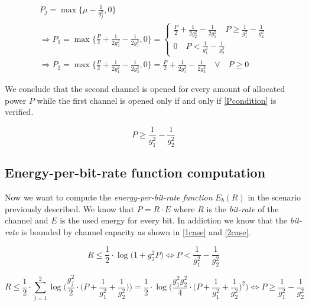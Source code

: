 \begin{equation}
	\begin{gathered}
	 P_j = \max\Big\{\mu - \frac{1}{g_j^2},0\Big\} \\
	 \Rightarrow P_1= \max\Big\{\frac{P}{2} + \frac{1}{2g_2^2} - \frac{1}{2g_1^2},0\Big\} = \begin{cases}
	  \frac{P}{2} + \frac{1}{2g_2^2} - \frac{1}{2g_1^2} \quad P \geq \frac{1}{g_1^2} - \frac{1}{g_2^2} \\
		0 \quad P < \frac{1}{g_1^2} - \frac{1}{g_2^2}
	 \end{cases} \\
	 \Rightarrow P_2= \max\Big\{\frac{P}{2} + \frac{1}{2g_1^2} - \frac{1}{2g_2^2},0\Big\} = \frac{P}{2} + \frac{1}{2g_1^2} - \frac{1}{2g_2^2} \quad \forall \quad P \geq 0
	\end{gathered}
\end{equation}

We conclude that the second channel is opened for every amount of allocated power $P$ while the first channel is opened only if and only if \eqref{Pcondition} is verified.

\begin{equation}
	P \geq \frac{1}{g_1^2} - \frac{1}{g_2^2}
	\label{Pcondition}
\end{equation}

\subsection{Energy-per-bit-rate function computation}

Now we want to compute the \textit{energy-per-bit-rate function} $E_b(R)$ in the scenario previously described. We know that $P = R \cdot E$ where $R$ is the \textit{bit-rate} of the channel and $E$ is the used energy for every bit. In addiction we know that the \textit{bit-rate} is bounded by channel capacity as shown in \eqref{1case} and \eqref{2case}.

\begin{equation}
		R \leq \frac{1}{2} \cdot \log\big( 1 + g_2^2P \big) \Leftrightarrow P < \frac{1}{g_1^2} - \frac{1}{g_2^2}
		\label{1case}
\end{equation}


\begin{equation}
		R \leq \frac{1}{2} \cdot \sum_{j=1}^2 \log\Big(\frac{g_j^2}{2} \cdot \Big(P+\frac{1}{g_1^2} + \frac{1}{g_2^2}\Big)\Big)= \frac{1}{2} \cdot \log\Big(\frac{g_1^2 g_2^2}{4} \cdot \Big(P+\frac{1}{g_1^2} + \frac{1}{g_2^2}\Big)^2\Big) \Leftrightarrow P \geq \frac{1}{g_1^2} - \frac{1}{g_2^2}
		\label{2case}
\end{equation}


